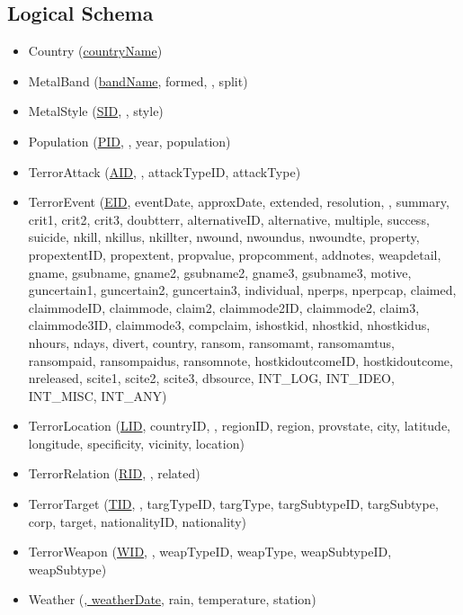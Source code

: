 \subsection{Logical Schema}
\begin{itemize}
\item Country (\underline{countryName})
\item MetalBand (\underline{bandName}, formed, , split)
\item MetalStyle (\underline{SID}, , style)
\item Population (\underline{PID}, , year, population)
\item TerrorAttack (\underline{AID}, , attackTypeID, attackType)
\item TerrorEvent (\underline{EID}, eventDate, approxDate, extended, resolution, , summary, crit1, crit2, crit3, doubtterr, alternativeID, alternative, multiple, success, suicide, nkill, nkillus, nkillter, nwound, nwoundus, nwoundte, property, propextentID, propextent, propvalue, propcomment, addnotes, weapdetail, gname, gsubname, gname2, gsubname2, gname3, gsubname3, motive, guncertain1, guncertain2, guncertain3, individual, nperps, nperpcap, claimed, claimmodeID, claimmode, claim2, claimmode2ID, claimmode2, claim3, claimmode3ID, claimmode3, compclaim, ishostkid, nhostkid, nhostkidus, nhours, ndays, divert, country, ransom, ransomamt, ransomamtus, ransompaid, ransompaidus, ransomnote, hostkidoutcomeID, hostkidoutcome, nreleased, scite1, scite2, scite3, dbsource, INT\_LOG, INT\_IDEO, INT\_MISC, INT\_ANY)
\item TerrorLocation (\underline{LID}, countryID, , regionID, region, provstate, city, latitude, longitude, specificity, vicinity, location)
\item TerrorRelation (\underline{RID}, , {related})
\item TerrorTarget (\underline{TID}, , targTypeID, targType, targSubtypeID, targSubtype, corp, target, nationalityID, nationality)
\item TerrorWeapon (\underline{WID}, , weapTypeID, weapType, weapSubtypeID, weapSubtype)
\item Weather (\underline{, weatherDate}, rain, temperature, station)
\end{itemize}


